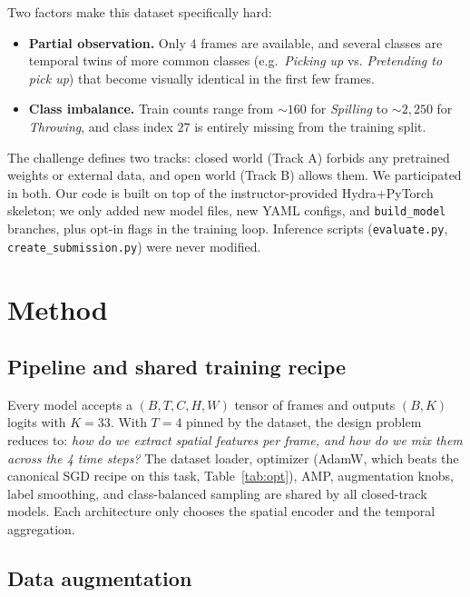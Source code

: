 \documentclass[10pt,twocolumn,letterpaper]{article}
\begin{document}
Two factors make this dataset specifically hard:
\begin{itemize}
    \item \textbf{Partial observation.} Only 4 frames are available, and
    several classes are temporal twins of more common classes
    (e.g.~\textit{Picking up} vs. \textit{Pretending to pick up}) that
    become visually identical in the first few frames.
    \item \textbf{Class imbalance.} Train counts range from
    $\sim$$160$ for \textit{Spilling} to $\sim$$2{,}250$ for
    \textit{Throwing}, and class index $27$ is entirely missing from the
    training split.
\end{itemize}

The challenge defines two tracks: closed world (Track A) forbids any
pretrained weights or external data, and open world (Track B) allows
them. We participated in both. Our code is built on top of the
instructor-provided Hydra+PyTorch skeleton; we only added new model
files, new YAML configs, and \texttt{build\_model} branches, plus
opt-in flags in the training loop. Inference scripts
(\texttt{evaluate.py}, \texttt{create\_submission.py}) were never
modified.

\section{Method}

\subsection{Pipeline and shared training recipe}

Every model accepts a $(B, T, C, H, W)$ tensor of frames and outputs
$(B, K)$ logits with $K=33$. With $T=4$ pinned by the dataset, the
design problem reduces to: \emph{how do we extract spatial features per
frame, and how do we mix them across the 4 time steps?} The dataset
loader, optimizer (AdamW, which beats the canonical SGD recipe on this
task, Table~\ref{tab:opt}), AMP, augmentation knobs, label smoothing,
and class-balanced sampling are shared by all closed-track models.
Each architecture only chooses the spatial encoder and the temporal
aggregation.

\subsection{Data augmentation}
\label{sec:aug}
\end{document}
